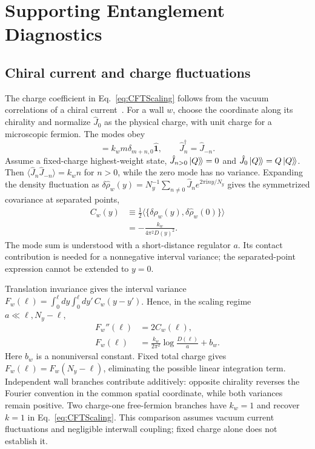 \documentclass[aps,prb,10pt,twocolumn,superscriptaddress,longbibliography,floatfix]{revtex4-2}
\newcommand{\ii}{\mathrm{i}}
\newcommand{\kett}[1]{\ket{#1}\!\rangle}
\begin{document}
{\color{blue}
\section{Supporting Entanglement Diagnostics}
\label{app:MutualInformation}

\subsection{Chiral current and charge fluctuations}
\label{app:CurrentFluctuations}

The charge coefficient in Eq.~\eqref{eq:CFTScaling} follows from the vacuum correlations of a chiral current~\cite{DiFrancescoMathieuSenechal1997}. For a wall $w$, choose the coordinate along its chirality and normalize $\hat J_0$ as the physical charge, with unit charge for a microscopic fermion. The modes obey
\begin{equation}
 [\hat J_m,\hat J_n]=k_wm\delta_{m+n,0}\hat{\mathbf{1}},
 \qquad \hat J_n^\dagger=\hat J_{-n}.
 \label{eq:CurrentAlgebra}
\end{equation}
Assume a fixed-charge highest-weight state, $\hat J_{n>0}\kett{Q}=0$ and $\hat J_0\kett{Q}=Q\kett{Q}$. Then $\langle\hat J_n\hat J_{-n}\rangle=k_wn$ for $n>0$, while the zero mode has no variance. Expanding the density fluctuation as $\delta\hat\rho_w(y)=N_y^{-1}\sum_{n\ne0}\hat J_ne^{2\pi\ii ny/N_y}$ gives the symmetrized covariance at separated points,
\begin{align}
 C_w(y)&\equiv\tfrac12\langle\{\delta\hat\rho_w(y),\delta\hat\rho_w(0)\}\rangle\nonumber\\
 &=-\frac{k_w}{4\pi^2D(y)^2}.
 \label{eq:CurrentCorrelation}
\end{align}
The mode sum is understood with a short-distance regulator $a$. Its contact contribution is needed for a nonnegative interval variance; the separated-point expression cannot be extended to $y=0$.

Translation invariance gives the interval variance $F_w(\ell)=\int_0^\ell dy\int_0^\ell dy'\,C_w(y-y')$. Hence, in the scaling regime $a\ll\ell,N_y-\ell$,
\begin{align}
 F_w''(\ell)&=2C_w(\ell),\nonumber\\
 F_w(\ell)&=\frac{k_w}{2\pi^2}\log\frac{D(\ell)}{a}+b_w.
 \label{eq:CurrentVariance}
\end{align}
Here $b_w$ is a nonuniversal constant. Fixed total charge gives $F_w(\ell)=F_w(N_y-\ell)$, eliminating the possible linear integration term. Independent wall branches contribute additively: opposite chirality reverses the Fourier convention in the common spatial coordinate, while both variances remain positive. Two charge-one free-fermion branches have $k_w=1$ and recover $k=1$ in Eq.~\eqref{eq:CFTScaling}. This comparison assumes vacuum current fluctuations and negligible interwall coupling; fixed charge alone does not establish it.

}
\end{document}
